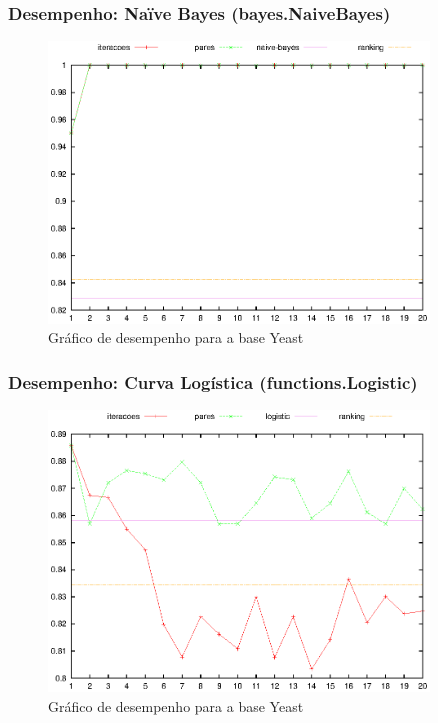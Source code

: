 \begin{frame}
    \frametitle{Desempenho: Naïve Bayes (bayes.NaiveBayes)}

    \begin{figure}[H]
        \centering
        \includegraphics[width=0.9\textwidth]{img/yeast_naive-bayes.eps}
        \caption{Gráfico de desempenho para a base Yeast}
    \end{figure}
\end{frame}


\begin{frame}
    \frametitle{Desempenho: Curva Logística (functions.Logistic)}

    \begin{figure}[H]
        \centering
        \includegraphics[width=0.9\textwidth]{img/yeast_logistic.eps}
        \caption{Gráfico de desempenho para a base Yeast}
    \end{figure}
\end{frame}

